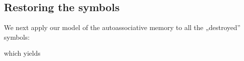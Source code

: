 \documentclass[a4paper,12pt,polish]{jupyterBook}
\begin{document}
\subsection{Restoring the symbols}
\label{\detokenize{docs/memory:restoring-the-symbols}}
\sphinxAtStartPar
We next apply our model of the autoassociative memory to all the „destroyed” symbols:
\begin{sphinxVerbatimInput}

\begin{sphinxVerbatim}[commandchars=\\\{\}]

\PYG{p}{[}\PYG{p}{]} 
\end{sphinxVerbatim}
\end{sphinxVerbatimInput}

\sphinxAtStartPar
which yields
\begin{sphinxVerbatimOutput}

\noindent{}
\end{sphinxVerbatimOutput}
\end{document}
